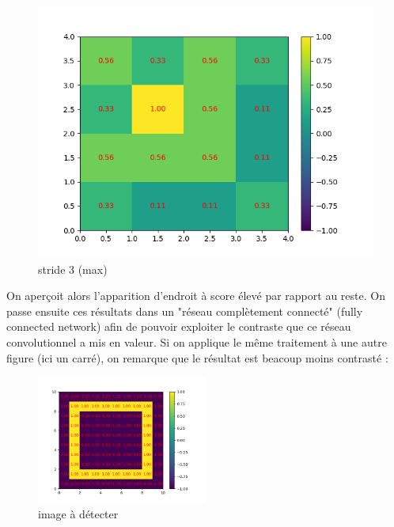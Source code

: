 \begin{figure}[h]
        \includegraphics[width=\textwidth]{img/cnn_exemple/cross/stride_3_max.png}
        \caption{stride 3 (max)}
    \endminipage
\end{figure}



On aperçoit alors l'apparition d'endroit à score élevé par rapport au reste.
On passe ensuite ces résultats dans un "réseau complètement connecté" (fully connected network) 
afin de pouvoir exploiter le contraste que ce réseau convolutionnel a mis en valeur.
Si on applique le même traitement à une autre figure (ici un carré), on remarque que le résultat est beacoup moins contrasté : 

\begin{figure}[h]
    \center
    \includegraphics[width=0.5\textwidth]{img/cnn_exemple/square/image_carre.png}
    \caption{image à détecter}
\end{figure}

\newpage

